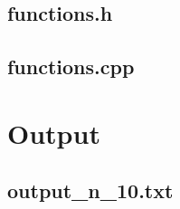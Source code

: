 \documentclass[11pt, a4paper, titlepage, openright]{article}
\begin{document}
	\subsection{functions.h}
		
	\bigskip
	\subsection{functions.cpp}
		

\section{Output}
	\subsection{output\_n\_10.txt}
		
\newpage
		
\end{document}
